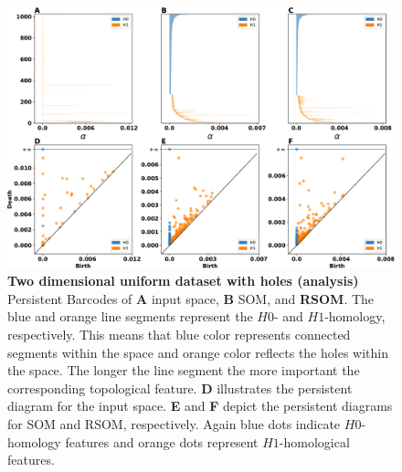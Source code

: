 \begin{figure}
  \centering
  \includegraphics[width=\columnwidth]{experiment-2D-holes-analysis.pdf}
  \caption{{\bfseries \sffamily Two dimensional uniform dataset with holes (analysis)}
  Persistent Barcodes of \textbf{A} input space, \textbf{B} SOM, and \textbf{RSOM}.
  The blue and orange line segments represent the $H0$- and $H1$-homology, respectively. This means
  that blue color represents connected segments within the space and orange color reflects the holes
  within the space. The longer the line segment the more important the corresponding topological
  feature. \textbf{D} illustrates the persistent diagram for the input space. \textbf{E} and \textbf{F}
  depict the persistent diagrams for SOM and RSOM, respectively. Again blue dots indicate $H0$-homology
  features and orange dots represent $H1$-homological features.}
  \label{fig:2D-holes:analysis}
\end{figure}
